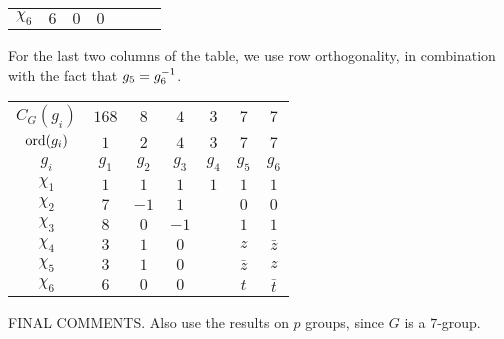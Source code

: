 \begin{boxexample}[Constructing the Character Table of $G = \PSL{2, 7}$]
\begin{table}[H]
\begin{subtable}{0.45\linewidth}
\begin{tabular}{|c|cccccc|}
                $\chi_6$ & $6$ & $0$ & $0$ & & & \\
            \end{tabular}
        \end{subtable}
    \end{table}
    For the last two columns of the table, we use row orthogonality, in combination with the fact that $g_5 = g_6^{-1}$.
    \begin{table}[H]
        \centering
        \begin{tabular}{|c|cccccc|}
            $C_G(g_i)$ & $168$ & $8$ & $4$ & $3$ & $7$ & $7$ \\
            $\operatorname{ord}\!\left( g_i \right)$ & $1$ & $2$ & $4$ & $3$ & $7$ & $7$ \\
            $g_i$ & $g_1$ & $g_2$ & $g_3$ & $g_4$ & $g_5$ & $g_6$ \\
            \hline
            $\chi_1$ & $1$ & $1$ & $1$ & $1$ & $1$ & $1$ \\
            $\chi_2$ & $7$ & $-1$ & $1$ & & $0$ & $0$ \\
            $\chi_3$ & $8$ & $0$ & $-1$ & & $1$ & $1$ \\
            $\chi_4$ & $3$ & $1$ & $0$ & & $z$ & $\bar{z}$ \\
            $\chi_5$ & $3$ & $1$ & $0$ & & $\bar{z}$ & $z$ \\
            $\chi_6$ & $6$ & $0$ & $0$ & & $t$ & $\bar{t}$ \\
        \end{tabular}
    \end{table}

    FINAL COMMENTS. Also use the results on $p$ groups, since $G$ is a $7$-group.
\end{boxexample}